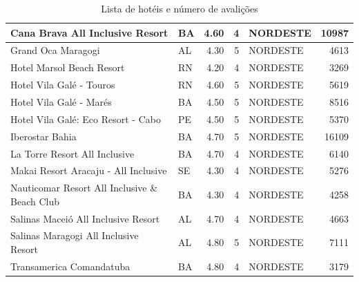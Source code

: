 \begin{table}[]
\begin{tabular}{|p{5cm}|l|r|r|l|r|}
		Cana Brava All Inclusive Resort               & BA              & 4.60          & 4                 & NORDESTE        & 10987               \\\hline
		Grand Oca Maragogi                            & AL              & 4.30          & 5                 & NORDESTE        & 4613                \\\hline
		Hotel Marsol Beach Resort                     & RN              & 4.20          & 4                 & NORDESTE        & 3269                \\\hline
		Hotel Vila Galé - Touros                      & RN              & 4.60          & 5                 & NORDESTE        & 5619                \\\hline
		Hotel Vila Galé - Marés                       & BA              & 4.50          & 5                 & NORDESTE        & 8516                \\\hline
		Hotel Vila Galé: Eco Resort - Cabo            & PE              & 4.50          & 5                 & NORDESTE        & 5370                \\\hline
		Iberostar Bahia                               & BA              & 4.70          & 5                 & NORDESTE        & 16109               \\\hline
		La Torre Resort All Inclusive                 & BA              & 4.70          & 4                 & NORDESTE        & 6140                \\\hline
		Makai Resort Aracaju - All Inclusive          & SE              & 4.30          & 4                 & NORDESTE        & 5276                \\\hline
		Nauticomar Resort All Inclusive \& Beach Club & BA              & 4.30          & 4                 & NORDESTE        & 4258                \\\hline
		Salinas Maceió All Inclusive Resort           & AL              & 4.70          & 4                 & NORDESTE        & 4663                \\\hline
		Salinas Maragogi All Inclusive Resort         & AL              & 4.80          & 5                 & NORDESTE        & 7111                \\\hline
		Transamerica Comandatuba                      & BA              & 4.80          & 4                 & NORDESTE        & 3179                \\\hline
	\end{tabular}%
	\caption{Lista de hotéis e número de avalições}
	\label{table:lista_hoteis}
\end{table}


